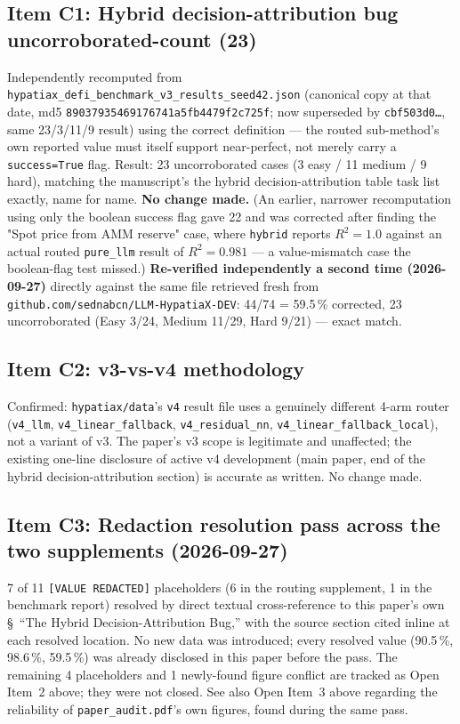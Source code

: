 \documentclass[11pt]{article}
\newcommand{\Rsq}{R^{2}}
\begin{document}
\subsection*{Item C1: Hybrid decision-attribution bug uncorroborated-count (23)}
Independently recomputed from \texttt{hypatiax\_defi\_benchmark\_v3\_results\_seed42.json}
(canonical copy at that date, md5 \texttt{89037935469176741a5fb4479f2c725f}; now superseded by \texttt{cbf503d0\ldots}, same 23/3/11/9 result) using the
correct definition — the routed sub-method's own reported value must itself
support near-perfect, not merely carry a \texttt{success=True} flag. Result:
23 uncorroborated cases (3 easy / 11 medium / 9 hard), matching the manuscript's
the hybrid decision-attribution table task list exactly, name for name.
\textbf{No change made.} (An earlier, narrower recomputation using only the
boolean success flag gave 22 and was corrected after finding the
"Spot price from AMM reserve" case, where \texttt{hybrid} reports
$\Rsq{=}1.0$ against an actual routed \texttt{pure\_llm} result of
$\Rsq{=}0.981$ — a value-mismatch case the boolean-flag test missed.)
\textbf{Re-verified independently a second time (2026-09-27)} directly
against the same file retrieved fresh from
\texttt{github.com/sednabcn/LLM-HypatiaX-DEV}: 44/74 = 59.5\,\% corrected,
23 uncorroborated (Easy 3/24, Medium 11/29, Hard 9/21) — exact match.

\subsection*{Item C2: v3-vs-v4 methodology}
Confirmed: \texttt{hypatiax/data}'s \texttt{v4} result file uses a genuinely
different 4-arm router (\texttt{v4\_llm}, \texttt{v4\_linear\_fallback},
\texttt{v4\_residual\_nn}, \texttt{v4\_linear\_fallback\_local}), not a variant
of v3. The paper's v3 scope is legitimate and unaffected; the existing
one-line disclosure of active v4 development (main paper, end of
the hybrid decision-attribution section) is accurate as written. No change made.

\subsection*{Item C3: Redaction resolution pass across the two supplements
(2026-09-27)}
7 of 11 \texttt{[VALUE REDACTED]} placeholders (6 in the routing
supplement, 1 in the benchmark report) resolved by direct textual
cross-reference to this paper's own \S~``The Hybrid
Decision-Attribution Bug,'' with the source section cited inline at each
resolved location. No new data was introduced; every resolved value
(90.5\,\%, 98.6\,\%, 59.5\,\%) was already disclosed in this paper before
the pass. The remaining 4 placeholders and 1 newly-found figure conflict
are tracked as Open Item~2 above; they were not closed. See also Open
Item~3 above regarding the reliability of \texttt{paper\_audit.pdf}'s own
figures, found during the same pass.
\end{document}
